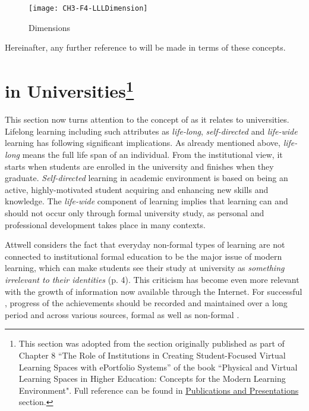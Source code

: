\begin{figure}[htb]
\centering
\texttt{[image: CH3-F4-LLLDimension]}
\caption{\LLLc Dimensions}
\label{fig:llldim}
\end{figure}

\FloatBarrier

Hereinafter, any further reference to \LLLs will be made in terms of these
concepts.

\section[\LLLc in Universities]{\LLLc in Universities\footnote{This section was
adopted from the section originally published as part of Chapter 8 ``The Role of
Institutions in Creating Student-Focused Virtual Learning Spaces with ePortfolio
Systems'' of the book ``Physical and Virtual Learning Spaces in Higher
Education: Concepts for the Modern Learning Environment". Full reference can be
found in \hyperref[sec:pub]{Publications and Presentations} section.} }

\label{sec:uni}

This section now turns attention to the concept of \LLLs as it relates to
universities. Lifelong learning including such attributes as \textit{life-long},
\textit{self-directed} and \textit{life-wide} learning has following significant
implications. As already mentioned above, \textit{life-long} means the full life
span of an individual. From the institutional view, it starts when students are
enrolled in the university and finishes when they graduate.
\textit{Self-directed} learning in academic environment is based on being an
active, highly-motivated student acquiring and enhancing new skills and
knowledge. The \textit{life-wide} component of learning implies that learning
can and should not occur only through formal university study, as personal and
professional development takes place in many contexts. 

Attwell \citeyearpar{Attwell2007} considers the fact that everyday non-formal
types of learning are not connected to institutional formal education to be the
major issue of modern learning, which can make students see their study at
university as \textit{something irrelevant to their identities} (p. 4). This
criticism has become even more relevant with the growth of information now
available through the Internet. For successful \LLLsn, progress of the
achievements should be recorded and maintained over a long period and across
various sources, formal as well as non-formal \citep{Kay2008}.

